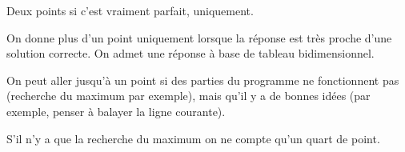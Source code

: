 \begin{correction}
\end{correction}
\begin{baremeenv}
Deux points si c'est vraiment parfait, uniquement.

On donne plus d'un point uniquement lorsque la réponse est très proche d'une solution correcte. On admet une réponse à base de tableau bidimensionnel.  

On peut aller jusqu'à un point si des parties du programme ne fonctionnent pas (recherche du maximum par exemple), mais qu'il y a de bonnes idées (par exemple, penser à balayer la ligne courante). 

S'il n'y a que la recherche du maximum on ne compte qu'un quart de point.  
\end{baremeenv}